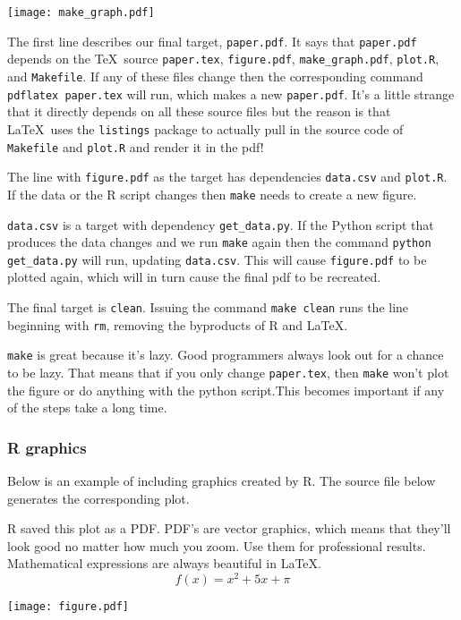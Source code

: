 \documentclass[11pt]{article}
\begin{document}
\centerline{\texttt{[image: make\_graph.pdf]}}

The first line describes our final target, {\tt paper.pdf}. It says that {\tt paper.pdf} depends on the \TeX\ source {\tt paper.tex}, {\tt figure.pdf}, {\tt make\_graph.pdf}, {\tt plot.R},  and {\tt Makefile}. If any of these files change then the corresponding command {\tt pdflatex paper.tex} will run, which makes a new {\tt paper.pdf}. It's a little strange that it directly depends on all these source files but the reason is that \LaTeX\ uses the {\tt listings} package to actually pull in the source code of {\tt Makefile} and {\tt plot.R} and render it in the pdf!

The line with {\tt figure.pdf} as the target has dependencies {\tt data.csv} and {\tt plot.R}. If the data or the R script changes then {\tt make} needs to create a new figure.

{\tt data.csv} is a target with dependency {\tt get\_data.py}. If the Python script that produces the data changes and we run {\tt make} again then the command {\tt python get\_data.py} will run, updating {\tt data.csv}. This will cause {\tt figure.pdf} to be plotted again, which will in turn cause the final pdf to be recreated.

The final target is {\tt clean}. Issuing the command {\tt make clean} runs the line beginning with {\tt rm}, removing the byproducts of R and \LaTeX.

{\tt make} is great because it's lazy. Good programmers always look out for a chance to be lazy. That means that if you only change {\tt paper.tex}, then {\tt make} won't plot the figure or do anything with the python script.This becomes important if any of the steps take a long time.

\subsubsection*{R graphics}

Below is an example of including graphics created by R. The source file below generates the corresponding plot.



R saved this plot as a PDF. PDF's are vector graphics, which means that they'll look good no matter how much you zoom. Use them for professional results. Mathematical expressions are always beautiful in \LaTeX. 
\[
    f(x) = x^2 + 5x + \pi
\]

\centerline{\texttt{[image: figure.pdf]}}
\end{document}
